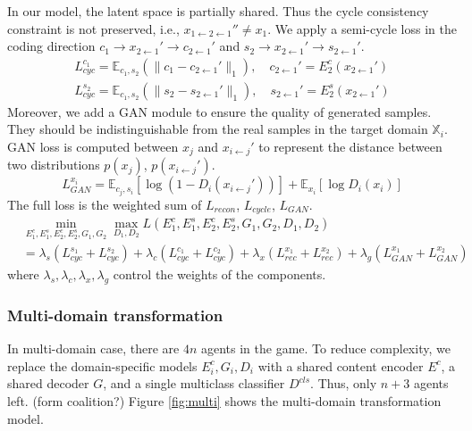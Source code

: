 \documentclass{article}
\begin{document}
In our model, the latent space is partially shared. Thus the cycle consistency constraint \cite{Zhu_2017_ICCV} is not preserved, i.e., $x_{1\leftarrow2\leftarrow1}'' \neq x_1$. We apply a semi-cycle loss in the coding direction $c_1 \rightarrow x_{2\leftarrow1}' \rightarrow c_{2\leftarrow1}'$ and $s_2 \rightarrow x_{2\leftarrow1}' \rightarrow s_{2\leftarrow1}'$.
\begin{equation}
\begin{aligned}
L_{cyc}^{c_1} = \mathbb{E}_{c_1, s_2} (\| c_1 - c_{2\leftarrow1}' \|_1), \quad c_{2\leftarrow1}'=E_2^c(x_{2\leftarrow1}') \\
L_{cyc}^{s_2} = \mathbb{E}_{c_1, s_2} (\| s_2 - s_{2\leftarrow1}' \|_1), \quad s_{2\leftarrow1}'=E_2^s(x_{2\leftarrow1}')
\end{aligned}
\end{equation}
Moreover, we add a GAN module to ensure the quality of generated samples. They should be indistinguishable from the real samples in the target domain $\mathbb{X}_i$. GAN loss is computed between $x_j$ and $x_{i\leftarrow j}'$ to represent the distance between two distributions $p(x_j)$, $p(x_{i\leftarrow j}')$.
\begin{equation}
L_{GAN}^{x_i} = \mathbb{E}_{c_j, s_i}[\log(1-D_i(x_{i\leftarrow j}'))] + \mathbb{E}_{x_i}[\log D_i(x_i)]
\end{equation}
The full loss is the weighted sum of $L_{recon}$, $L_{cycle}$, $L_{GAN}$.
\begin{equation}
\begin{aligned}
&\min_{E_1^c,E_1^s,E_2^c,E_2^s, G_1,G_2}\max_{D_1,D_2} L(E_1^c, E_1^s, E_2^c, E_2^s, G_1, G_2, D_1, D_2) \\
&= \lambda_s (L_{cyc}^{s_1} + L_{cyc}^{s_2}) + \lambda_c (L_{cyc}^{c_1} + L_{cyc}^{c_2}) + \lambda_x (L_{rec}^{x_1} + L_{rec}^{x_2}) + \lambda_g (L_{GAN}^{x_1} + L_{GAN}^{x_2})
\end{aligned}
\end{equation}
where $\lambda_s, \lambda_c, \lambda_x, \lambda_g$ control the weights of the components.


\subsubsection{Multi-domain transformation}
In multi-domain case, there are $4n$ agents in the game. To reduce complexity, we replace the domain-specific models $E^c_i, G_i, D_i$ with a shared content encoder $E^c$, a shared decoder $G$, and a single multiclass classifier $D^{cls}$. Thus, only $n+3$ agents left. {\color{blue} (form coalition?)} Figure \ref{fig:multi} shows the multi-domain transformation model.
\end{document}
